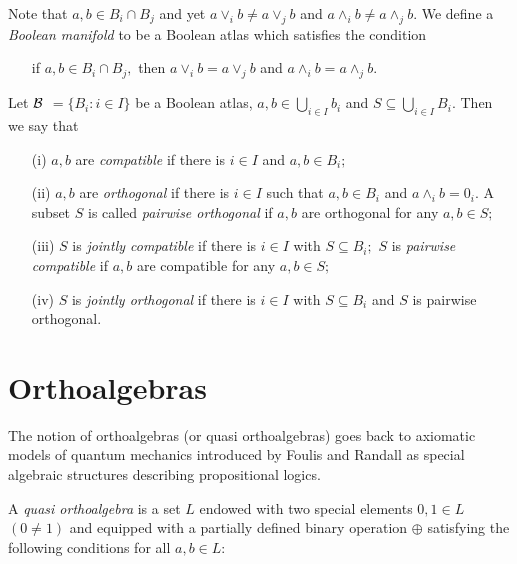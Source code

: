 Note that $a,b \in B_i \cap B_j$ and yet $a \vee_i b
\ne a\vee_j b$ and $a\wedge_i b \ne a\wedge_j b.$ We define a {\it Boolean
manifold} to be a Boolean atlas which satisfies the condition

\begin{enumerate}
\item[] if $a,b \in B_i \cap B_j,$  then $a \vee_i b = a\vee_j b$ and
$a\wedge_i b = a\wedge_j b.$
\end{enumerate}

Let $\cal {B}$ $ = \{B_i: i \in I\}$ be a Boolean atlas, $a,b \in \bigcup_{i \in I}
b_i$ and $S \subseteq \bigcup_{i\in I} B_i.$ Then we say that

\begin{enumerate}
\item[{\rm (i)}] $a,b$ are {\it compatible} if there is $i \in I$
and $a,b \in B_i;$\vspace{-2mm}

\item[{\rm (ii)}] $a,b$ are {\it orthogonal} if there is $i \in I$ such that
$a,b \in B_i$ and $a \wedge_i b = 0_i.$ A subset $S$ is called {\it pairwise
orthogonal} if $a,b $ are orthogonal for any $a,b \in S;$\vspace{-2mm}

\item[{\rm (iii)}]  $S$ is {\it jointly compatible} if there is $i \in I$ with
$S \subseteq B_i;$ $S$ is {\it pairwise compatible} if $a,b $ are compatible
for any $a,b \in S;$\vspace{-2mm}

\item[{\rm (iv)}] $S$ is {\it jointly orthogonal} if there is $i \in I$
with $S \subseteq B_i$ and $S$ is pairwise orthogonal.
\end{enumerate}

\section{Orthoalgebras}%

The notion of orthoalgebras  (or quasi orthoalgebras) goes back to
axiomatic models of quantum mechanics introduced by
Foulis and Randall
\cite{FR,RF}
as  special algebraic structures describing propositional logics.

A {\it quasi orthoalgebra} is a set $L$ endowed with two special
elements $0,1 \in L$ $(0 \ne 1)$ and equipped with a partially defined
binary operation $\oplus$ satisfying the following conditions for
all $a,b \in L:$

